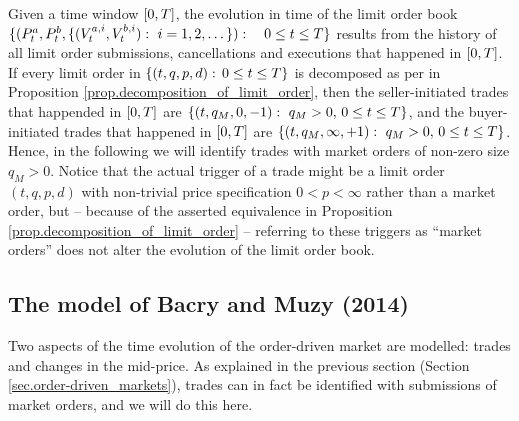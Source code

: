 \documentclass[10pt, article,table]{article}
\begin{document}
Given a time window $\timeWindow$, the evolution in time of the limit order book $\lbrace (\bestAskPrice_t, \bestBidPrice_t,\lbrace (\nthBestAskVolume[i]_t, \nthBestBidVolume[i]_t) : \, \, i=1,2,\dots\rbrace):  \quad 0\leq t \leq \timeHorizon \rbrace$ results from the history of all limit order submissions,  cancellations and executions that happened in $\timeWindow$. If every limit order in   $\lbrace (t,q,p,d): \, 0\leq t\leq \timeHorizon\rbrace$ is decomposed as per in Proposition \ref{prop.decomposition_of_limit_order}, then the seller-initiated trades that happended in $\timeWindow$ are $\lbrace (t,q_M,0,-1):\, \,  q_M>0, \, 0\leq t\leq \timeHorizon \rbrace$, and the buyer-initiated trades that happened in $\timeWindow$ are $\lbrace (t,q_M,\infty,+1):\, \,  q_M>0, \, 0\leq t\leq \timeHorizon \rbrace$.  Hence, in the following we will identify trades with market orders of non-zero size $q_M>0$. Notice that the actual trigger of a trade might be a limit order $(t,q,p,d)$ with non-trivial price specification $0<p<\infty$ rather than a market order, but -- because of the asserted equivalence in Proposition \ref{prop.decomposition_of_limit_order} -- referring to these triggers as ``market orders'' does not alter the evolution of the limit order book.  





\subsection{The model of Bacry and Muzy (2014)}\label{sec.BM14_model}
Two aspects of the time evolution of the order-driven market are modelled: trades and changes in the mid-price. As explained in the previous section (Section \ref{sec.order-driven_markets}), trades can in fact be identified with submissions of market orders, and we will do this here.
\end{document}
